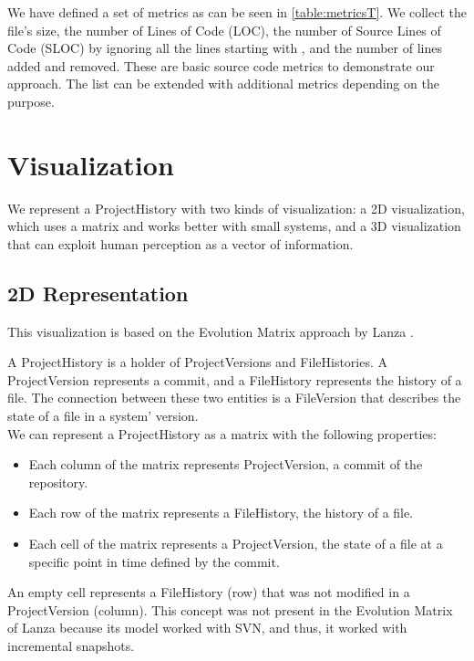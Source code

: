 We have defined a set of metrics as can be seen in \autoref{table:metricsT}. We collect the file's size, the number of Lines of Code (LOC), the number of Source Lines of Code (SLOC) by ignoring all the lines starting with \quote{//}, and the number of lines added and removed. These are basic source code metrics to demonstrate our approach. The list can be extended with additional metrics depending on the purpose.


\section{Visualization}
We represent a ProjectHistory with two kinds of visualization: a 2D visualization, which uses a matrix and works better with small systems, and a 3D visualization that can exploit human perception as a vector of information. 


\subsection{2D Representation}
This visualization is based on the Evolution Matrix approach by Lanza \cite{Lanza2001}. 

A ProjectHistory is a holder of ProjectVersions and FileHistories. 
A ProjectVersion represents a commit, and a FileHistory represents the history of a file. 
The connection between these two entities is a FileVersion that describes the state of a file in a system' version. \\
We can represent a ProjectHistory as a matrix with the following properties: 
\begin{itemize}
    \item Each column of the matrix represents ProjectVersion, a commit of the repository. 
    \item Each row of the matrix represents a FileHistory, the history of a file. 
    \item Each cell of the matrix represents a ProjectVersion, the state of a file at a specific point in time defined by the commit. 
\end{itemize}

An empty cell represents a FileHistory (row) that was not modified in a ProjectVersion (column). 
This concept was not present in the Evolution Matrix of Lanza because its model worked with SVN, and thus, it worked with incremental snapshots.  

